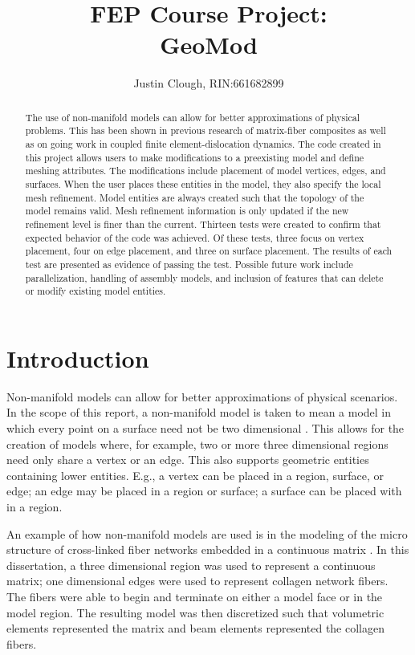 \documentclass[a4paper, 12pt]{article}
\author{Justin Clough, RIN:661682899}
\title{FEP Course Project: \\
        GeoMod}
\begin{document}
\maketitle

\begin{abstract}
The use of non-manifold models can allow for better approximations of
physical problems.
This has been shown in previous research of matrix-fiber composites
as well as on going work in coupled finite element-dislocation 
dynamics. 
The code created in this project allows users to make 
modifications to a preexisting model and define meshing attributes. 
The modifications include placement of model vertices, edges, and surfaces. 
When the user places these entities in the model, they also 
specify the local mesh refinement.
Model entities are always created such that the topology of the model
remains valid.
Mesh refinement information is only updated if the new refinement
level is finer than the current.
Thirteen tests were created to confirm that expected behavior 
of the code was achieved. 
Of these tests, three focus on vertex placement, 
four on edge placement, and three on surface placement. 
The results of each test are presented as evidence of passing the test. 
Possible future work include parallelization, handling of assembly
models, and inclusion of features that can delete or modify
existing model entities.
\end{abstract}

\newpage
\section{Introduction} \label{sec:intro}
Non-manifold models can allow for better approximations 
of physical scenarios. 
In the scope of this report, a non-manifold model is taken to mean 
a model in which every point on a surface need not be 
two dimensional \cite{weiler86}. 
This allows for the creation of models where, for example, two 
or more three dimensional regions need only share a vertex or an edge.
This also 
supports geometric entities containing lower entities. E.g., a vertex
can be placed in a region, surface, or edge; an edge may be placed in
a region or surface; a surface can be placed with in a region.

An example of how non-manifold models are used is in 
the modeling of the micro structure of cross-linked 
fiber networks embedded in a continuous matrix \cite{zhangThesis}. 
In this dissertation, a three dimensional region was used to represent 
a continuous matrix; one dimensional edges were used to represent collagen 
network fibers. The fibers were able to begin and terminate on either a 
model face or in the model region. The resulting model was then discretized 
such that volumetric elements represented the matrix 
and beam elements represented the collagen fibers.
\end{document}
